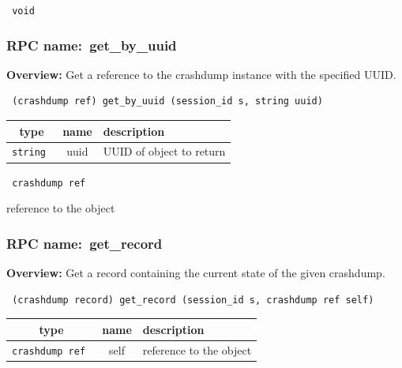 \vspace{0.3cm}

{\tt 
void
}



\vspace{0.3cm}
\vspace{0.3cm}
\vspace{0.3cm}
\subsubsection{RPC name:~get\_by\_uuid}

{\bf Overview:} 
Get a reference to the crashdump instance with the specified UUID.

\begin{verbatim} (crashdump ref) get_by_uuid (session_id s, string uuid)\end{verbatim}



 
\vspace{0.3cm}
\begin{tabular}{|c|c|p{7cm}|}
 \hline
{\bf type} & {\bf name} & {\bf description} \\ \hline
{\tt string } & uuid & UUID of object to return \\ \hline 

\end{tabular}

\vspace{0.3cm}

{\tt 
crashdump ref
}


reference to the object
\vspace{0.3cm}
\vspace{0.3cm}
\vspace{0.3cm}
\subsubsection{RPC name:~get\_record}

{\bf Overview:} 
Get a record containing the current state of the given crashdump.

\begin{verbatim} (crashdump record) get_record (session_id s, crashdump ref self)\end{verbatim}



 
\vspace{0.3cm}
\begin{tabular}{|c|c|p{7cm}|}
 \hline
{\bf type} & {\bf name} & {\bf description} \\ \hline
{\tt crashdump ref } & self & reference to the object \\ \hline 

\end{tabular}

